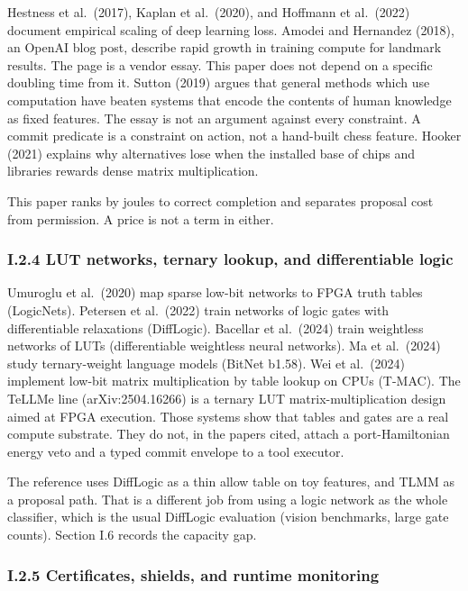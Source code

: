 \documentclass[
  10pt,
]{article}
\begin{document}
Hestness et al.~(2017), Kaplan et al.~(2020), and Hoffmann et al.~(2022)
document empirical scaling of deep learning loss. Amodei and Hernandez
(2018), an OpenAI blog post, describe rapid growth in training compute
for landmark results. The page is a vendor essay. This paper does not
depend on a specific doubling time from it. Sutton (2019) argues that
general methods which use computation have beaten systems that encode
the contents of human knowledge as fixed features. The essay is not an
argument against every constraint. A commit predicate is a constraint on
action, not a hand-built chess feature. Hooker (2021) explains why
alternatives lose when the installed base of chips and libraries rewards
dense matrix multiplication.

This paper ranks by joules to correct completion and separates proposal
cost from permission. A price is not a term in either.

\subsubsection{I.2.4 LUT networks, ternary lookup, and differentiable
logic}\label{i.2.4-lut-networks-ternary-lookup-and-differentiable-logic}

Umuroglu et al.~(2020) map sparse low-bit networks to FPGA truth tables
(LogicNets). Petersen et al.~(2022) train networks of logic gates with
differentiable relaxations (DiffLogic). Bacellar et al.~(2024) train
weightless networks of LUTs (differentiable weightless neural networks).
Ma et al.~(2024) study ternary-weight language models (BitNet b1.58).
Wei et al.~(2024) implement low-bit matrix multiplication by table
lookup on CPUs (T-MAC). The TeLLMe line (arXiv:2504.16266) is a ternary
LUT matrix-multiplication design aimed at FPGA execution. Those systems
show that tables and gates are a real compute substrate. They do not, in
the papers cited, attach a port-Hamiltonian energy veto and a typed
commit envelope to a tool executor.

The reference uses DiffLogic as a thin allow table on toy features, and
TLMM as a proposal path. That is a different job from using a logic
network as the whole classifier, which is the usual DiffLogic evaluation
(vision benchmarks, large gate counts). Section I.6 records the capacity
gap.

\subsubsection{I.2.5 Certificates, shields, and runtime
monitoring}\label{i.2.5-certificates-shields-and-runtime-monitoring}
\end{document}
